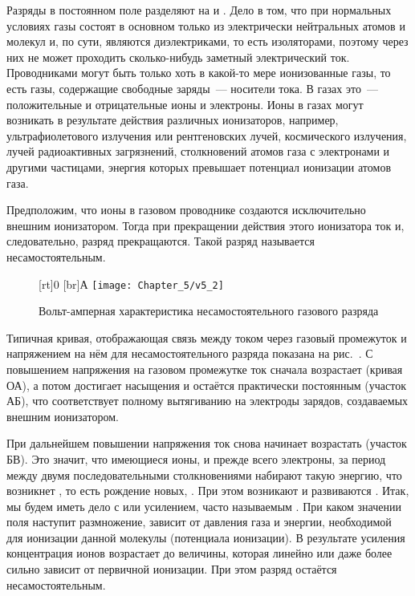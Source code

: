 Разряды в постоянном поле разделяют на  и . Дело в том, что при нормальных
условиях газы состоят в основном только из электрически нейтральных атомов и молекул и, по сути, являются диэлектриками,
то есть изоляторами, поэтому через них не может проходить сколько-нибудь заметный электрический ток. Проводниками могут
быть только хоть в какой-то мере ионизованные газы, то есть газы, содержащие свободные заряды~--- носители тока. В газах
это~--- положительные и отрицательные ионы и электроны. Ионы в газах могут возникать в результате действия различных
ионизаторов, например, ультрафиолетового излучения или рентгеновских лучей, космического излучения, лучей радиоактивных
загрязнений, столкновений атомов газа с электронами и другими частицами, энергия которых превышает потенциал ионизации
атомов газа.

Предположим, что ионы в газовом проводнике создаются исключительно внешним ионизатором. Тогда при прекращении действия
этого ионизатора ток и, следовательно, разряд прекращаются. Такой разряд называется несамостоятельным.

\begin{figure}[h!]
	\centering
	[rt]{0}
	[br]{А}
	\texttt{[image: Chapter\_5/v5\_2]}
	\caption{Вольт-амперная характеристика несамостоятельного газового разряда}
\end{figure}

Типичная кривая, отображающая связь между током через газовый промежуток и напряжением на нём для несамостоятельного разряда показана на рис.~. С повышением напряжения
на газовом промежутке ток сначала возрастает (кривая ОА), а потом достигает насыщения и остаётся практически постоянным (участок АБ), что соответствует полному вытягиванию на электроды зарядов, создаваемых внешним ионизатором.

При дальнейшем повышении напряжения ток снова начинает возрастать (участок БВ). Это значит, что имеющиеся ионы, и прежде всего электроны, за период между двумя последовательными столкновениями набирают такую энергию, что возникнет
, то есть рождение новых, . При этом возникают и развиваются
. Итак, мы будем иметь дело с  или усилением, часто называемым . При каком значении поля наступит размножение, зависит от давления газа и энергии, необходимой для ионизации
данной молекулы (потенциала ионизации). В результате усиления концентрация ионов возрастает до величины, которая линейно
или даже более сильно зависит от первичной ионизации. При этом разряд остаётся несамостоятельным.

